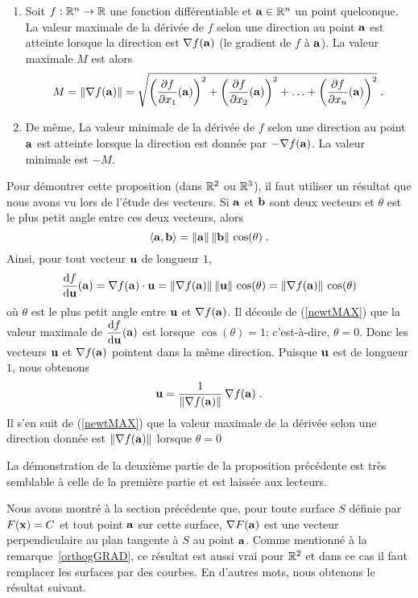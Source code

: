 {\begin{prop}
\begin{enumerate}
\item Soit $f:\mathbb{R}^n\rightarrow \mathbb{R}$ une fonction différentiable et
$\mathbf{a} \in \mathbb{R}^n$ un point quelconque.  La valeur maximale de la dérivée de
$f$ selon une direction au point $\mathbf{a}$ est atteinte lorsque la direction
est $\nabla f(\mathbf{a})$ (le gradient de $f$ à $\mathbf{a}$).  La valeur maximale
$M$ est alors
\[
M = \|\nabla f(\mathbf{a}) \| =
\sqrt{\left(\frac{\partial f}{\partial x_1}(\mathbf{a})\right)^2 +
\left(\frac{\partial f}{\partial x_2}(\mathbf{a})\right)^2 + \ldots +
\left(\frac{\partial f}{\partial x_n}(\mathbf{a})\right)^2 } \; .
\]
\item De même, La valeur minimale de la dérivée de $f$ selon une direction au
point $\mathbf{a}$ est atteinte lorsque la direction est donnée par
$-\nabla f(\mathbf{a})$.  La valeur minimale est $-M$.
\end{enumerate}
\label{SteepestG}
\end{prop}

Pour démontrer cette proposition (dans $\mathbb{R}^2$ ou $\mathbb{R}^3$), il faut utiliser
un résultat que nous avons vu lors de l'étude des vecteurs.  Si $\mathbf{a}$ et
$\mathbf{b}$ sont deux vecteurs et $\theta$ est le plus petit angle entre ces
deux vecteurs, alors
\[
\left\langle{\mathbf{a}} , {\mathbf{b}}\right\rangle = \|\mathbf{a}\|\,\|\mathbf{b}\| \, \cos(\theta) \; .
\]
Ainsi, pour tout vecteur $\mathbf{u}$ de longueur $1$,
\begin{equation}\label{newtMAX}
\frac{\mathrm{d}f}{\mathrm{d}\mathbf{u}}(\mathbf{a}) = \nabla f(\mathbf{a}) \cdot \mathbf{u}
=\|\nabla f(\mathbf{a})\|\,\|\mathbf{u}\|\,\cos(\theta)
=\|\nabla f(\mathbf{a})\|\,\cos(\theta)
\end{equation}
où $\theta$ est le plus petit angle entre $\mathbf{u}$ et $\nabla f(\mathbf{a})$.
Il découle de (\ref{newtMAX}) que la valeur maximale de
$\displaystyle \frac{\mathrm{d}f}{\mathrm{d}\mathbf{u}}(\mathbf{a})$ est lorsque
$\cos(\theta)=1$; c'est-à-dire, $\theta =0$.  Donc les vecteurs
$\mathbf{u}$ et $\nabla f(\mathbf{a})$ pointent dans la même
direction.  Puisque $\mathbf{u}$ est de longueur $1$, nous obtenons
\[
\mathbf{u} = \frac{1}{\|\nabla f(\mathbf{a})\|}\,\nabla f(\mathbf{a}) \; .
\]
Il s'en suit de (\ref{newtMAX}) que la valeur maximale de la dérivée
selon une direction donnée est $\|\nabla f(\mathbf{a})\|$ lorsque $\theta = 0$

La démonstration de la deuxième partie de la proposition précédente est très
semblable à celle de la première partie et est laissée aux lecteurs.

Nous avons montré à la section précédente que, pour toute surface $S$
définie par $F(\mathbf{x})=C$ et tout point $\mathbf{a}$ sur cette surface,
$\nabla F(\mathbf{a})$ est une vecteur perpendiculaire au plan tangente à $S$ au
point $\mathbf{a}$.  Comme mentionné à la remarque~\ref{orthogGRAD}, ce
résultat est aussi vrai pour $\mathbb{R}^2$ et dans ce cas il faut
remplacer les surfaces par des courbes.  En d'autres mots, nous
obtenons le résultat suivant.

}
